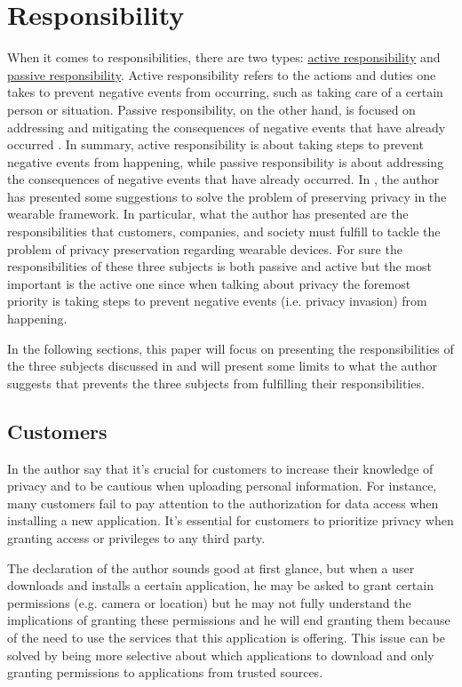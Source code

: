 \documentclass{article}
\begin{document}
\section{Responsibility}
When it comes to responsibilities, there are two types: \ul{active responsibility} and \ul{passive responsibility}. Active responsibility refers to the actions and duties one takes to prevent negative events from occurring, such as taking care of a certain person or situation. Passive responsibility, on the other hand, is focused on addressing and mitigating the consequences of negative events that have already occurred \cite{poel_ethics_2011}. In summary, active responsibility is about taking steps to prevent negative events from happening, while passive responsibility is about addressing the consequences of negative events that have already occurred.
In \cite{chang_ethical_2019}, the author has presented some suggestions to solve the problem of preserving privacy in the wearable framework. In particular, what the author has presented are the responsibilities that customers, companies, and society must fulfill to tackle the problem of privacy preservation regarding wearable devices. For sure the responsibilities of these three subjects is both passive and active but the most important is the active one since when talking about privacy the foremost priority is taking steps to prevent negative events (i.e. privacy invasion) from happening. 

In the following sections, this paper will focus on presenting the responsibilities of the three subjects discussed in \cite{chang_ethical_2019} and will present some limits to what the author suggests that prevents the three subjects from fulfilling their responsibilities.
\subsection{Customers} 
In \cite{chang_ethical_2019} the author say that it's crucial for customers to increase their knowledge of privacy and to be cautious when uploading personal information. For instance, many customers fail to pay attention to the authorization for data access when installing a new application. It's essential for customers to prioritize privacy when granting access or privileges to any third party.

The declaration of the author sounds good at first glance, but when a user downloads and installs a certain application, he may be asked to grant certain permissions (e.g. camera or location) but he may not fully understand the implications of granting these permissions and he will end granting them because of the need to use the services that this application is offering. This issue can be solved by being more selective about which applications to download and only granting permissions to applications from trusted sources. 
\end{document}
